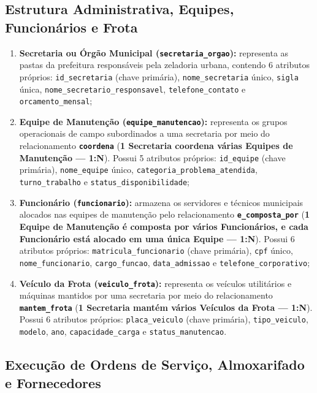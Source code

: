 \documentclass[12pt,a4paper]{article}
\begin{document}
\subsection{Estrutura Administrativa, Equipes, Funcionários e Frota}

\begin{enumerate}[resume]
  \item \textbf{Secretaria ou Órgão Municipal (\texttt{secretaria\_orgao}):} representa as pastas da prefeitura responsáveis pela zeladoria urbana, contendo 6 atributos próprios: \texttt{id\_secretaria} (chave primária), \texttt{nome\_secretaria} único, \texttt{sigla} única, \texttt{nome\_\allowbreak secretario\_\allowbreak responsavel}, \texttt{telefone\_contato} e \texttt{orcamento\_mensal};
  \item \textbf{Equipe de Manutenção (\texttt{equipe\_manutencao}):} representa os grupos operacionais de campo subordinados a uma secretaria por meio do relacionamento \textbf{\texttt{coordena}} (\textbf{1 Secretaria coordena várias Equipes de Manutenção --- 1:N}). Possui 5 atributos próprios: \texttt{id\_equipe} (chave primária), \texttt{nome\_equipe} único, \texttt{categoria\_\allowbreak problema\_atendida}, \texttt{turno\_trabalho} e \texttt{status\_disponibilidade};
  \item \textbf{Funcionário (\texttt{funcionario}):} armazena os servidores e técnicos municipais alocados nas equipes de manutenção pelo relacionamento \textbf{\texttt{e\_composta\_por}} (\textbf{1 Equipe de Manutenção é composta por vários Funcionários, e cada Funcionário está alocado em uma única Equipe --- 1:N}). Possui 6 atributos próprios: \texttt{matricula\_funcionario} (chave primária), \texttt{cpf} único, \texttt{nome\_funcionario}, \texttt{cargo\_funcao}, \texttt{data\_admissao} e \texttt{telefone\_\allowbreak corporativo};
  \item \textbf{Veículo da Frota (\texttt{veiculo\_frota}):} representa os veículos utilitários e máquinas mantidos por uma secretaria por meio do relacionamento \textbf{\texttt{mantem\_frota}} (\textbf{1 Secretaria mantém vários Veículos da Frota --- 1:N}). Possui 6 atributos próprios: \texttt{placa\_veiculo} (chave primária), \texttt{tipo\_veiculo}, \texttt{modelo}, \texttt{ano}, \texttt{capacidade\_carga} e \texttt{status\_manutencao}.
\end{enumerate}

\subsection{Execução de Ordens de Serviço, Almoxarifado e Fornecedores}
\end{document}

